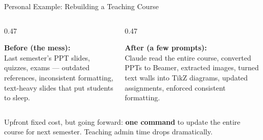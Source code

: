 \documentclass[aspectratio=169, 11pt]{beamer}
\newcommand{\emphgold}[1]{\alert{\textbf{#1}}}
\begin{document}
\begin{frame}{Personal Example: Rebuilding a Teaching Course}
\begin{columns}[T]
\begin{column}{0.47\textwidth}
  \begin{tcolorbox}[
    enhanced, colback=red!5, colframe=red!30, boxrule=0.5pt,
    sharp corners, left=8pt, right=8pt, top=5pt, bottom=5pt,
  ]
    {\small\bfseries\color{coral} Before (the mess):}\\[4pt]
    {\scriptsize Last semester's PPT slides, quizzes, exams --- outdated references, inconsistent formatting, text-heavy slides that put students to sleep.}
  \end{tcolorbox}
\end{column}
\begin{column}{0.47\textwidth}
  \begin{tcolorbox}[
    enhanced, colback=green!5, colframe=green!30!black, boxrule=0.5pt,
    sharp corners, left=8pt, right=8pt, top=5pt, bottom=5pt,
  ]
    {\small\bfseries\color{sage} After (a few prompts):}\\[4pt]
    {\scriptsize Claude read the entire course, converted PPTs to Beamer, extracted images, turned text walls into TikZ diagrams, updated assignments, enforced consistent formatting.}
  \end{tcolorbox}
\end{column}
\end{columns}

\vspace{0.1cm}
\begin{keyinsight}
  {\small Upfront fixed cost, but going forward: \emphgold{one command} to update the entire course for next semester. Teaching admin time drops dramatically.}
\end{keyinsight}
\end{frame}
\end{document}
